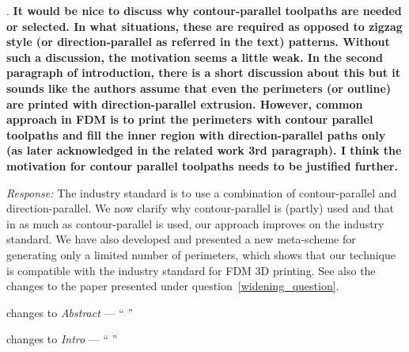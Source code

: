 \documentclass[5p,10pt,times]{elsarticle}
\theoremstyle{definition}
\newcommand{\revise}[2]{{\color{red}{#1}\color{blue}{#2}}}
\newcommand{\commits}[1]{{\bf\begin{alltt} {#1}\end{alltt}}}
\renewcommand{\commits}[1]{}
\newcommand\paper[2]{\par changes to \emph{#1} --- ``#2'' }
\newcommand\Que[1]{%
   \leavevmode\par
   \refstepcounter{question}
   \noindent
   \thequestion. {\bf#1}\par}
\newcounter{question}
\numberwithin{question}{section}
\newcommand\Ans[2][]{%
    \leavevmode\par\noindent
   {%
    {\it Response:} \textbf{#1}#2\par}}
\begin{document}
\Que{
It would be nice to discuss why contour-parallel toolpaths are needed or selected. In what situations, these are required as opposed to zigzag style (or direction-parallel as referred in the text) patterns. Without such a discussion, the motivation seems a little weak. In the second paragraph of introduction, there is a short discussion about this but it sounds like the authors assume that even the perimeters (or outline) are printed with direction-parallel extrusion. However, common approach in FDM is to print the perimeters with contour parallel toolpaths and fill the inner region with direction-parallel paths only (as later acknowledged in the related work 3rd paragraph). I think the motivation for contour parallel toolpaths needs to be justified further. 
}
\Ans{
The industry standard is to use a combination of contour-parallel and direction-parallel.
We now clarify why contour-parallel is (partly) used and that in as much as contour-parallel is used, our approach improves on the industry standard.
We have also developed and presented a new meta-scheme for generating only a limited number of perimeters, which shows that our technique is compatible with the industry standard for FDM 3D printing.
See also the changes to the paper presented under question~\ref{widening_question}.
}

\commits{
6b0f8c78d31bd0c6946885da96f73f1cfc1a21ae %
ac800628951417dcb28bd6e3a0ed08801735acf4 %
a88ccd3309aef1233ed00ce9f22b244fe64668f4 %
077c8ee138bb311a8ba9abf303af4b09e973637a %
8a11aa0105d1c7f1f5690c8e1f932be85a90bcae %
}
\paper{Abstract}{
\revise{By densely filling consecutive 2D layers with contour-parallel extrusion toolpaths, FDM can produce parts with high stiffness and strength.}
{High stiffness parts are produced by filling the 2D polygons of consecutive layers (partly) with contour-parallel extrusion toolpaths.}
}

\paper{Intro}{
\revise{
Contour-parallel extrusion therefore leads to a less bumpy outline shape than direction-parallel extrusion does.
}{
Because contour-parallel extrusion leads to a more accurate outline shape it is common practice to print either the whole layer or only a limited number of outer perimeters that way.
This paper improves on those contour-parallel toolpaths and addresses several issues which commonly occur in 3D models with narrow geometry.
}
}
\end{document}
